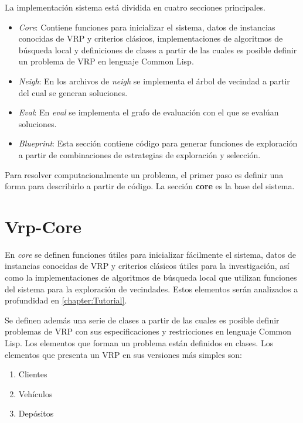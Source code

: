 La implementación sistema está dividida en cuatro secciones principales.

\begin{itemize}
	\item \textit{Core}: Contiene funciones para inicializar el sistema, datos de instancias conocidas de VRP y criterios clásicos, implementaciones de algoritmos de búsqueda local y definiciones de clases a partir de las cuales es posible definir un problema de VRP en lenguaje Common Lisp.
	\item \textit{Neigh}: En los archivos de \textit{neigh} se implementa el árbol de vecindad a partir del cual se generan soluciones.
	\item \textit{Eval}: En \textit{eval} se implementa el grafo de evaluación con el que se evalúan soluciones.
	\item \textit{Blueprint}: Esta sección contiene código para generar funciones de exploración a partir de combinaciones de estrategias de exploración y selección.
\end{itemize}

Para resolver computacionalmente un problema, el primer paso es definir una forma para describirlo a partir de código. La sección \textbf{core} es la base del sistema. 


\section{Vrp-Core}\label{3-core}

En \textit{core} se definen funciones útiles para inicializar fácilmente el sistema, datos de instancias conocidas de VRP y criterios clásicos útiles para la investigación, así como la implementaciones de algoritmos de búsqueda local que utilizan funciones del sistema para la exploración de vecindades. Estos elementos serán analizados a profundidad en \ref{chapter:Tutorial}.

Se definen además una serie de clases a partir de las cuales es posible definir problemas de VRP con sus especificaciones y restricciones en lenguaje Common Lisp. Los elementos que forman un problema están definidos en clases. Los elementos que presenta un VRP en sus versiones más simples son:

\begin{enumerate}
	\item Clientes
	\item Vehículos
	\item Depósitos
\end{enumerate}

